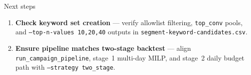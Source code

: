 \documentclass[11pt]{beamer}
\begin{document}
\begin{frame}{Next steps}
  \begin{enumerate}
    \item \textbf{Check keyword set creation} --- verify allowlist filtering, \texttt{top\_conv} pools, and \texttt{--top-n-values 10,20,40} outputs in \texttt{segment-keyword-candidates.csv}.
    \item \textbf{Ensure pipeline matches two-stage backtest} --- align \texttt{run\_campaign\_pipeline}, stage~1 multi-day MILP, and stage~2 daily budget path with \texttt{--strategy two\_stage}.
  \end{enumerate}
\end{frame}
\end{document}
